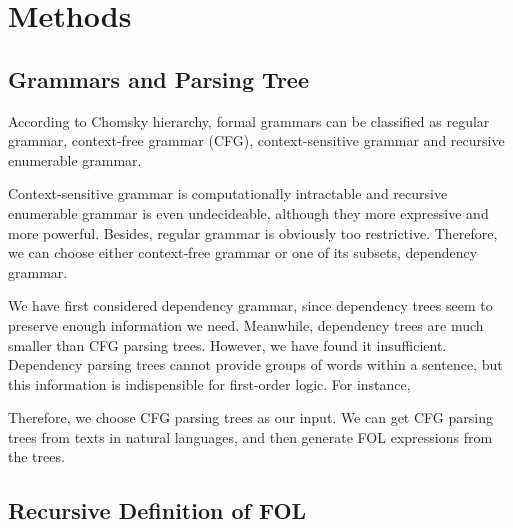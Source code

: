 \documentclass{article}
\begin{document}
\section{Methods}{
	\subsection{Grammars and Parsing Tree}{ 
		\cite{su}

		According to Chomsky hierarchy, formal grammars can be classified as regular grammar, context-free grammar (CFG), context-sensitive grammar and recursive enumerable grammar. 

		Context-sensitive grammar is computationally intractable and recursive enumerable grammar is even undecideable, although they more expressive and more powerful. Besides, regular grammar is obviously too restrictive. Therefore, we can choose either context-free grammar or one of its subsets, dependency grammar. 

		We have first considered dependency grammar, since dependency trees seem to preserve enough information we need. Meanwhile, dependency trees are much smaller than CFG parsing trees. However, we have found it insufficient. Dependency parsing trees cannot provide groups of words within a sentence, but this information is indispensible for first-order logic. For instance, 

		Therefore, we choose CFG parsing trees as our input. We can get CFG parsing trees from texts in natural languages, and then generate FOL expressions from the trees. 
	}

	\subsection{Recursive Definition of FOL}{





}}
\end{document}
